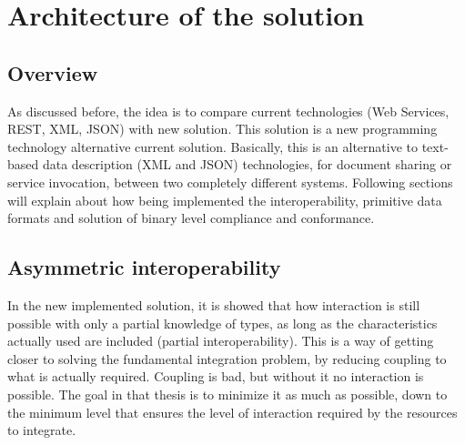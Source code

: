 
\chapter{Architecture of the solution}
\label{chapter:architecture}


\section{Overview}
\label{section:overview}

As discussed before, the idea is to compare current technologies (Web Services, REST, XML, JSON) with new solution. This solution is a new programming technology alternative current solution. Basically, this is an alternative to text-based data description (XML and JSON) technologies, for document sharing or service invocation, between two completely different systems. Following sections will explain about how being implemented the interoperability, primitive data formats and solution of binary level compliance and conformance.

\section{Asymmetric interoperability}
\label{section:AsymmetricInteroperability}

In the new implemented solution, it is showed that how interaction is still possible with only a partial knowledge of types, as long as the characteristics actually used are included (partial interoperability). This is a way of getting closer to solving the fundamental integration problem, by reducing coupling to what is actually required. Coupling is bad, but without it no interaction is possible. The goal in that thesis is to minimize it as much as possible, down to the minimum level that ensures the level of interaction required by the resources to integrate.

